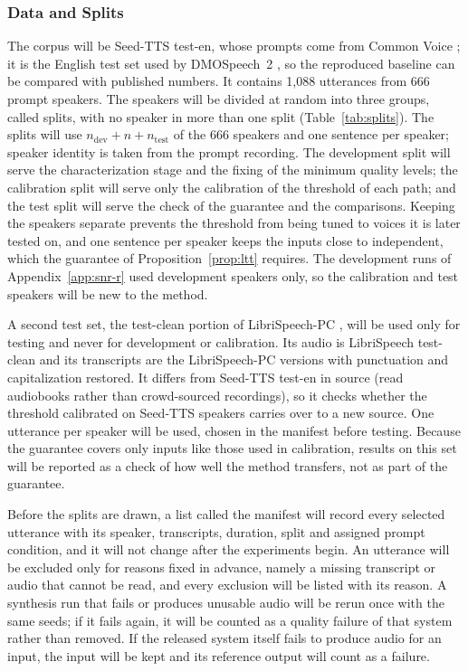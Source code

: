 \subsubsection{Data and Splits}
\label{sec:data}

The corpus will be Seed-TTS test-en, whose prompts come from Common Voice \parencite{anastassiou2024seedtts,ardila2020commonvoice}; it is the English test set used by DMOSpeech~2 \parencite{li2025dmospeech2}, so the reproduced baseline can be compared with published numbers. It contains 1,088 utterances from 666 prompt speakers. The speakers will be divided at random into three groups, called splits, with no speaker in more than one split (Table~\ref{tab:splits}). The splits will use $n_{\text{dev}}+n+n_{\text{test}}$ of the 666 speakers and one sentence per speaker; speaker identity is taken from the prompt recording. The development split will serve the characterization stage and the fixing of the minimum quality levels; the calibration split will serve only the calibration of the threshold of each path; and the test split will serve the check of the guarantee and the comparisons. Keeping the speakers separate prevents the threshold from being tuned to voices it is later tested on, and one sentence per speaker keeps the inputs close to independent, which the guarantee of Proposition~\ref{prop:ltt} requires. The development runs of Appendix~\ref{app:snr-r} used development speakers only, so the calibration and test speakers will be new to the method.

A second test set, the test-clean portion of LibriSpeech-PC \parencite{meister2023librispeechpc}, will be used only for testing and never for development or calibration. Its audio is LibriSpeech test-clean \parencite{panayotov2015librispeech} and its transcripts are the LibriSpeech-PC versions with punctuation and capitalization restored. It differs from Seed-TTS test-en in source (read audiobooks rather than crowd-sourced recordings), so it checks whether the threshold calibrated on Seed-TTS speakers carries over to a new source. One utterance per speaker will be used, chosen in the manifest before testing. Because the guarantee covers only inputs like those used in calibration, results on this set will be reported as a check of how well the method transfers, not as part of the guarantee.

Before the splits are drawn, a list called the manifest will record every selected utterance with its speaker, transcripts, duration, split and assigned prompt condition, and it will not change after the experiments begin. An utterance will be excluded only for reasons fixed in advance, namely a missing transcript or audio that cannot be read, and every exclusion will be listed with its reason. A synthesis run that fails or produces unusable audio will be rerun once with the same seeds; if it fails again, it will be counted as a quality failure of that system rather than removed. If the released system itself fails to produce audio for an input, the input will be kept and its reference output will count as a failure.

